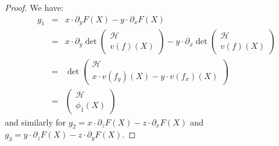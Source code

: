 \documentclass[11pt, a4paper, reqno, captions=tableheading,bibliography=totoc]{scrartcl}
\theoremstyle{plain}
\theoremstyle{definition}
\newcommand{\de}{\partial}
\begin{document}
\begin{proof} We have:
\begin{eqnarray*}
g_1 & =  & x \cdot \de_y F(X)- y \cdot \de_xF(X) \\
& = & 
x\cdot \de_y \det \left( \begin{array}{c} \mathcal{H}\\ v(f)(X)
\end{array} \right) -y \cdot
\de_x \det \left( \begin{array}{c} \mathcal{H}\\ v(f)(X)
\end{array} \right) \\
& = & \det \left( \begin{array}{c} \mathcal{H}\\ x \cdot v(f_y)(X)-
y \cdot v(f_x)(X)
\end{array} \right)\\
& = & \left( \begin{array}{c} \mathcal{H}\\ 
\phi_1(X)
\end{array} \right)
\end{eqnarray*}
and similarly for $g_2 = x \cdot \de_z F(X)- z \cdot \de_xF(X)$
and $g_3 = y \cdot \de_z F(X)- z \cdot \de_yF(X)$.
\end{proof}
\end{document}
